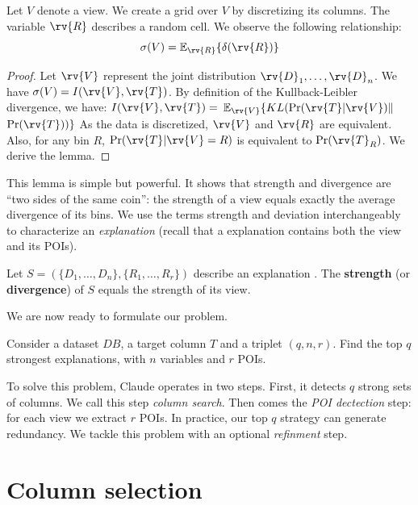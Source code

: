 \begin{lemma}
Let $V$ denote a view. We create a grid over $V$ by discretizing its
columns. The variable $\rv{R}$ describes a random cell.  We observe the
following relationship:
\[
    \sigma(V) = \mathbb{E}_{\rv{R}} \{ \delta(\rv{R}) \}
\]
\end{lemma}

\begin{proof}
Let $\rv{V}$ represent the joint distribution $\rv{D}_1, \ldots, \rv{D}_n$.
We have $\sigma(V) = I(\rv{V},\rv{T})$.
By definition of the Kullback-Leibler divergence, we have: 
$I(\rv{V},\rv{T}) = $ $\mathbb{E}_{\rv{V}} \{ KL( \Pr(\rv{T} | \rv{V}) \|$ $ \Pr(\rv{T}) ) \}$
As the data is discretized, $\rv{V}$ and $\rv{R}$ are equivalent. Also,
for any bin $R$, $\Pr(\rv{T} | \rv{V} = R)$ is equivalent to
$\Pr(\rv{T}_R)$. We derive the lemma.
\end{proof}


This lemma is simple but powerful. It shows that strength and divergence are
``two sides of the same coin'': the strength of a view equals exactly the
average divergence of its bins. We use the terms strength and
deviation interchangeably to characterize an \emph{explanation} (recall that a
explanation contains both the view and its POIs).

\begin{definition}
Let $S=(\{ D_1, \ldots, D_n\}, \{R_1, \ldots, R_r\})$ describe an explanation . The
\textbf{strength} (or \textbf{divergence}) of $S$ equals the strength
of its view.
\end{definition}

We are now ready to formulate our problem.

\begin{problem}
Consider a dataset $DB$, a target column $T$ and a triplet $(q, n, r)$. Find
the top $q$ strongest explanations, with $n$ variables and $r$ POIs.
\end{problem}

To solve this problem, Claude operates in two steps. First, it detects $q$
strong sets of columns.  We call this step \emph{column search}.  Then comes
the \emph{POI dectection} step: for each view we extract $r$ POIs. In practice,
our top $q$ strategy can generate redundancy. We tackle this problem with an
optional \emph{refinment} step.

\section{Column selection}
\label{sec:colum}

